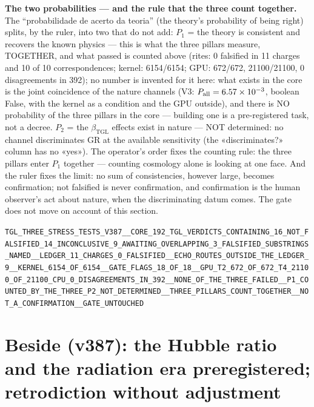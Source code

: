 \documentclass[11pt]{article}
\newcommand{\bTGL}{\beta_{\mathrm{TGL}}}\newcommand{\Msun}{M_{\odot}}\newcommand{\TGL}{\mathrm{TGL}}
\theoremstyle{definition}\newtheorem{deriv}{Derivation}
\begin{document}
\textbf{The two probabilities --- and the rule that the three count together.} The ``probabilidade de acerto da teoria'' (the theory's probability of being right) splits, by the ruler, into two that do not add: $P_1$ = the theory is consistent and recovers the known physics --- this is what the three pillars measure, TOGETHER, and what passed is counted above (rites: 0 falsified in 11 charges and 10 of 10 correspondences; kernel: 6154/6154; GPU: 672/672, 21100/21100, 0 disagreements in 392); no number is invented for it here: what exists in the core is the joint coincidence of the nature channels (V3: $P_{\rm all}=6.57\times10^{-3}$, boolean False, with the kernel as a condition and the GPU outside), and there is NO probability of the three pillars in the core --- building one is a pre-registered task, not a decree. $P_2$ = the $\bTGL$ effects exist in nature --- NOT determined: no channel discriminates GR at the available sensitivity (the «discriminates?» column has no «yes»). The operator's order fixes the counting rule: the three pillars enter $P_1$ together --- counting cosmology alone is looking at one face. And the ruler fixes the limit: no sum of consistencies, however large, becomes confirmation; not falsified is never confirmation, and confirmation is the human observer's act about nature, when the discriminating datum comes. The gate does not move on account of this section.

\begin{center}\small\texttt{TGL\_THREE\_STRESS\_TESTS\_V387\_\_CORE\_192\_TGL\_VERDICTS\_CONTAINING\_16\_NOT\_FALSIFIED\_14\_INCONCLUSIVE\_9\_AWAITING\_OVERLAPPING\_3\_FALSIFIED\_SUBSTRINGS\_NAMED\_\_LEDGER\_11\_CHARGES\_0\_FALSIFIED\_\_ECHO\_ROUTES\_OUTSIDE\_THE\_LEDGER\_9\_\_KERNEL\_6154\_OF\_6154\_\_GATE\_FLAGS\_18\_OF\_18\_\_GPU\_T2\_672\_OF\_672\_T4\_21100\_OF\_21100\_CPU\_0\_DISAGREEMENTS\_IN\_392\_\_NONE\_OF\_THE\_THREE\_FAILED\_\_P1\_COUNTED\_BY\_THE\_THREE\_P2\_NOT\_DETERMINED\_\_THREE\_PILLARS\_COUNT\_TOGETHER\_\_NOT\_A\_CONFIRMATION\_\_GATE\_UNTOUCHED}\end{center}

\section*{Beside (v387): the Hubble ratio and the radiation era preregistered; retrodiction without adjustment}

\end{document}
